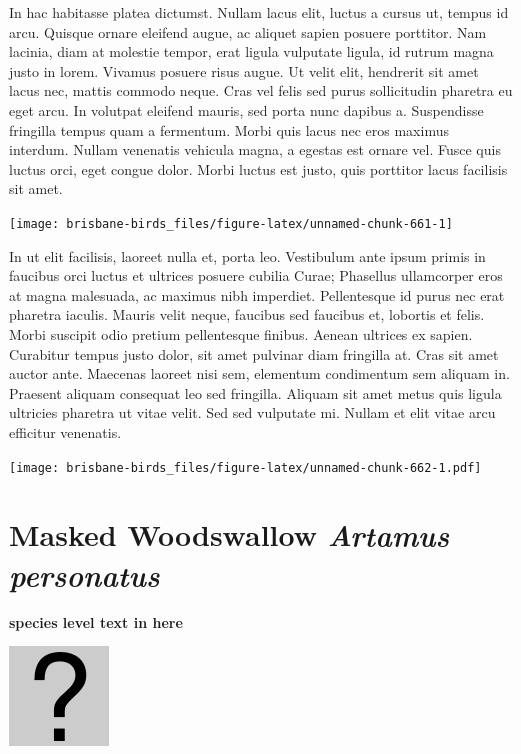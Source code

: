 \documentclass[]{book}
\let\origfigure\figure
\let\endorigfigure\endfigure
\renewenvironment{figure}[1][2] {
  \expandafter\origfigure\expandafter[H]
} {
  \endorigfigure
}
\begin{document}
In hac habitasse platea dictumst. Nullam lacus elit, luctus a cursus ut,
tempus id arcu. Quisque ornare eleifend augue, ac aliquet sapien posuere
porttitor. Nam lacinia, diam at molestie tempor, erat ligula vulputate
ligula, id rutrum magna justo in lorem. Vivamus posuere risus augue. Ut
velit elit, hendrerit sit amet lacus nec, mattis commodo neque. Cras vel
felis sed purus sollicitudin pharetra eu eget arcu. In volutpat eleifend
mauris, sed porta nunc dapibus a. Suspendisse fringilla tempus quam a
fermentum. Morbi quis lacus nec eros maximus interdum. Nullam venenatis
vehicula magna, a egestas est ornare vel. Fusce quis luctus orci, eget
congue dolor. Morbi luctus est justo, quis porttitor lacus facilisis sit
amet.

\begin{figure}
\texttt{[image: brisbane-birds\_files/figure-latex/unnamed-chunk-661-1]} \caption{insert figure caption}\label{fig:unnamed-chunk-661}
\end{figure}

In ut elit facilisis, laoreet nulla et, porta leo. Vestibulum ante ipsum
primis in faucibus orci luctus et ultrices posuere cubilia Curae;
Phasellus ullamcorper eros at magna malesuada, ac maximus nibh
imperdiet. Pellentesque id purus nec erat pharetra iaculis. Mauris velit
neque, faucibus sed faucibus et, lobortis et felis. Morbi suscipit odio
pretium pellentesque finibus. Aenean ultrices ex sapien. Curabitur
tempus justo dolor, sit amet pulvinar diam fringilla at. Cras sit amet
auctor ante. Maecenas laoreet nisi sem, elementum condimentum sem
aliquam in. Praesent aliquam consequat leo sed fringilla. Aliquam sit
amet metus quis ligula ultricies pharetra ut vitae velit. Sed sed
vulputate mi. Nullam et elit vitae arcu efficitur venenatis.

\begin{figure}
\centering
\texttt{[image: brisbane-birds\_files/figure-latex/unnamed-chunk-662-1.pdf]}
\caption{\label{fig:unnamed-chunk-662}insert figure caption}
\end{figure}

\section{\texorpdfstring{Masked Woodswallow \emph{Artamus
personatus}}{Masked Woodswallow Artamus personatus}}\label{masked-woodswallow-artamus-personatus}

\textbf{species level text in here}

\begin{figure}
\centering
\includegraphics{assets/missing.png}
\caption{No image for species}
\end{figure}
\end{document}
